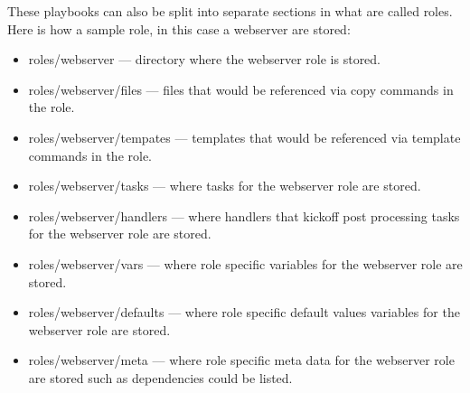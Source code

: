These playbooks can also be split into separate sections in what are called roles.
Here is how a sample role, in this case a webserver are stored:
\begin{itemize}
\item roles/webserver --- directory where the webserver role is stored.
\item roles/webserver/files --- files that would be referenced via copy commands in the role.
\item roles/webserver/tempates --- templates that would be referenced via template commands in the role.
\item roles/webserver/tasks --- where tasks for the webserver role are stored.
\item roles/webserver/handlers --- where handlers that kickoff post processing tasks for the webserver role are stored.
\item roles/webserver/vars --- where role specific variables for the webserver role are stored.
\item roles/webserver/defaults --- where role specific default values variables for the webserver role are stored.
\item roles/webserver/meta --- where role specific meta data for the webserver role are stored such as dependencies could be listed.
\end{itemize}

